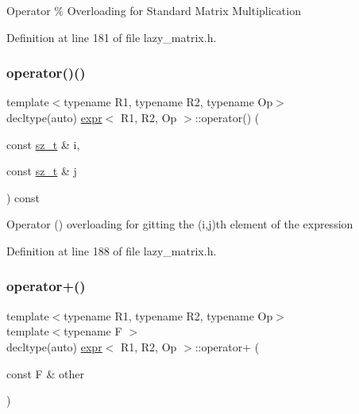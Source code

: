 Operator \% Overloading for Standard Matrix Multiplication 

Definition at line 181 of file lazy\+\_\+matrix.\+h.

\mbox{\label{classexpr_a095b81efbf9ed48db95750cd726460a2}} 
\subsubsection{\texorpdfstring{operator()()}{operator()()}}
{\footnotesize\ttfamily template$<$typename R1, typename R2, typename Op$>$ \\
decltype(auto) \mbox{\hyperlink{classexpr}{expr}}$<$ R1, R2, Op $>$\+::operator() (\begin{DoxyParamCaption}\item[{const \mbox{\hyperlink{lazy__matrix_8h_acba2745dcfc55b2d05ff45adc6a0a015}{sz\+\_\+t}} \&}]{i,  }\item[{const \mbox{\hyperlink{lazy__matrix_8h_acba2745dcfc55b2d05ff45adc6a0a015}{sz\+\_\+t}} \&}]{j }\end{DoxyParamCaption}) const\hspace{0.3cm}{\ttfamily [inline]}}

Operator () overloading for gitting the (i,j)th element of the expression 

Definition at line 188 of file lazy\+\_\+matrix.\+h.

\mbox{\label{classexpr_a252251779aa235aed7a5a7fec6ebe995}} 
\subsubsection{\texorpdfstring{operator+()}{operator+()}}
{\footnotesize\ttfamily template$<$typename R1, typename R2, typename Op$>$ \\
template$<$typename F $>$ \\
decltype(auto) \mbox{\hyperlink{classexpr}{expr}}$<$ R1, R2, Op $>$\+::operator+ (\begin{DoxyParamCaption}\item[{const F \&}]{other }\end{DoxyParamCaption})\hspace{0.3cm}{\ttfamily [inline]}}

